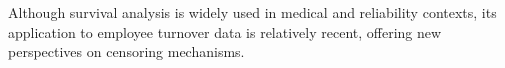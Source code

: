 Although survival analysis is widely used in medical and reliability contexts, its application to employee turnover data is relatively recent, offering new perspectives on censoring mechanisms.